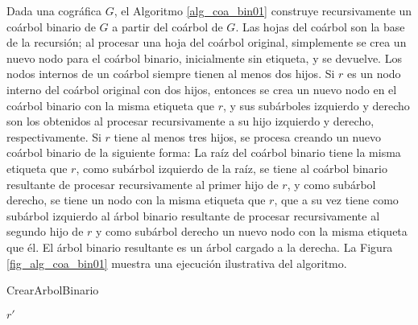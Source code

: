 Dada una cogr\'afica $G$, el Algoritmo \ref{alg_coa_bin01} construye
recursivamente un co\'arbol binario de $G$ a partir del co\'arbol de $G$.
Las hojas del co\'arbol son la base de la recursi\'on; al procesar una hoja
del co\'arbol original, simplemente se crea un nuevo nodo para el co\'arbol
binario, inicialmente sin etiqueta, y se devuelve.  Los nodos internos de
un co\'arbol siempre tienen al menos dos hijos.   Si $r$ es un nodo interno
del co\'arbol original con dos hijos, entonces se crea un nuevo nodo en
el co\'arbol binario con la misma etiqueta que $r$, y sus sub\'arboles
izquierdo y derecho son los obtenidos al procesar recursivamente a su
hijo izquierdo y derecho, respectivamente.   Si $r$ tiene al menos tres
hijos, se procesa creando un nuevo coárbol binario de la siguiente forma:
La raíz del coárbol binario tiene la misma etiqueta que $r$, como
sub\'arbol izquierdo de la ra\'iz, se tiene al coárbol binario resultante
de procesar recursivamente al primer hijo de $r$, y como sub\'arbol derecho,
se tiene un nodo con la misma etiqueta que $r$, que a su vez tiene como
sub\'arbol izquierdo al árbol binario resultante de procesar recursivamente
al segundo hijo de $r$ y como sub\'arbol derecho un nuevo nodo con la misma
etiqueta que \'el. El árbol binario resultante es un árbol cargado a la
derecha. La Figura \ref{fig_alg_coa_bin01} muestra
una ejecución ilustrativa del algoritmo.

\begin{algorithm}[ht!]
\caption{CrearArbolBinario}
\label{alg_coa_bin01}
\DontPrintSemicolon %

\Return $r'$\;

\end{algorithm}

